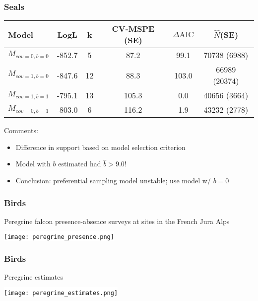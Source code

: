 \documentclass[serif,mathserif]{beamer}
\begin{document}
\begin{frame}
\frametitle{Seals}
\begin{tabular}{lccccc}
  \hline
  Model & LogL & k & CV-MSPE (SE)& $\Delta \textrm{AIC}$ & $\hat{N}$(SE) \\
  \hline
 $M_{cov=0,b=0}$ & -852.7 & 5 & 87.2 & 99.1 & 70738 (6988) \\
 $M_{cov=1,b=0}$ & -847.6 & 12 & 88.3 & 103.0 & 66989 (20374) \\
 $M_{cov=1,b=1}$ & -795.1 & 13 & 105.3 & 0.0 & 40656 (3664) \\
 $M_{cov=0,b=1}$ & -803.0 & 6 & 116.2 & 1.9 & 43232 (2778) \\
  \hline
\end{tabular} \pause

\vspace{.3cm}

Comments:
\begin{itemize}
  \item Difference in support based on model selection criterion  \pause
  \item Model with $b$ estimated had $\hat{b} > 9.0$! \pause
  \item Conclusion: preferential sampling model unstable; use model w/ $b=0$
\end{itemize}
\end{frame}

\begin{frame}
\frametitle{Birds}
Peregrine falcon presence-absence surveys at sites in the French Jura Alps

\vspace{.5cm}

\colorbox{white}{\texttt{[image: peregrine\_presence.png]}}
\end{frame}

\begin{frame}
\frametitle{Birds}
Peregrine estimates

\vspace{.5cm}

\colorbox{white}{\texttt{[image: peregrine\_estimates.png]}}
\end{frame}
\end{document}
